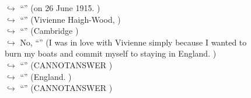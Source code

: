 \documentclass[11pt,a4paper, onecolumn]{article}
\begin{document}
\begin{figure}[t] \small \begin{tcolorbox}[boxsep=0pt,left=5pt,right=0pt,top=2pt,colback = yellow!5] \begin{dialogue}
 \small 
\colorbox{pink!25}{$\hookrightarrow$}
{ ``'' (on 26 June 1915. ) }
\\
\colorbox{pink!25}{$\hookrightarrow$}
{ ``'' (Vivienne Haigh-Wood, ) }
\\
\colorbox{pink!25}{$\hookrightarrow$}
{ ``'' (Cambridge ) }
\\
\colorbox{pink!25}{$\hookrightarrow$}
\colorbox{red!25}{No,}
{ ``'' (I was in love with Vivienne simply because I wanted to burn my boats and commit myself to staying in England. ) }
\\
\colorbox{pink!25}{$\hookrightarrow$}
{ ``'' (CANNOTANSWER ) }
\\
\colorbox{pink!25}{$\hookrightarrow$}
{ ``'' (England. ) }
\\
\colorbox{pink!25}{$\hookrightarrow$}
{ ``'' (CANNOTANSWER ) }
\\
 \end{dialogue}\end{tcolorbox}\end{figure}
\end{document}
